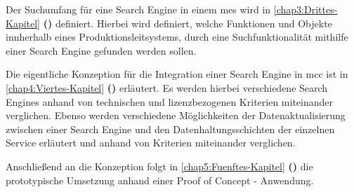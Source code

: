 Der Suchumfang für eine Search Engine in einem \gls{mes} wird in \autoref{chap3:Drittes-Kapitel} \textbf{()} definiert. Hierbei wird definiert, welche Funktionen und Objekte innherhalb eines Produktionsleitsystems, durch eine Suchfunktionalität mithilfe einer Search Engine gefunden werden sollen.

Die eigentliche Konzeption für die Integration einer Search Engine in \gls{mcc} ist in \autoref{chap4:Viertes-Kapitel} \textbf{()} erläutert. Es werden hierbei verschiedene Search Engines anhand von technischen und lizenzbezogenen Kriterien miteinander verglichen. Ebenso werden verschiedene Möglichkeiten der Datenaktualisierung zwischen einer Search Engine und den Datenhaltungsschichten der einzelnen Service erläutert und anhand von Kriterien miteinander verglichen.

Anschließend an die Konzeption folgt in \autoref{chap5:Fuenftes-Kapitel} \textbf{()} die prototypische Umsetzung anhand einer Proof of Concept - Anwendung.